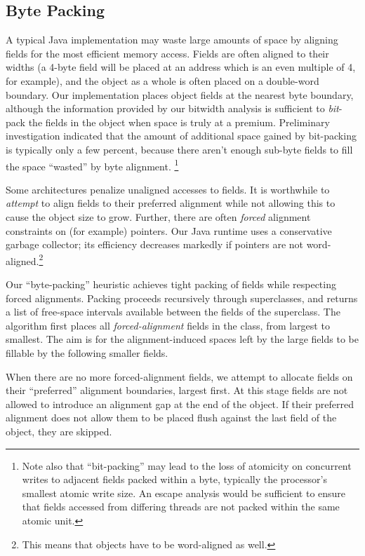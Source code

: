 \documentclass{acmconf}
\begin{document}
\subsection{Byte Packing}
%
A typical Java implementation may waste large amounts of space by
aligning fields for the most efficient memory access.  Fields are
often aligned to their widths (a 4-byte field will be placed at an address
which is an even multiple of 4, for example), and the object as a
whole is often placed on a double-word boundary. Our implementation
places object fields at the nearest byte boundary, although
the information provided by our bitwidth
analysis is sufficient to {\it bit}-pack the fields in the object
when space is truly at a premium.  Preliminary investigation
indicated that the amount of additional space gained by bit-packing 
is typically only a few percent, because there aren't enough sub-byte
fields to fill the space ``wasted'' by byte alignment.%
\footnote{Note also that ``bit-packing'' may lead to the loss of
atomicity on concurrent writes to adjacent fields packed within a byte,
typically the processor's smallest atomic write size.  An escape
analysis would be sufficient to ensure that fields accessed from
differing threads are not packed within the same atomic unit.}

Some architectures penalize unaligned accesses to fields.  It is
worthwhile to {\it attempt} to align fields to their preferred
alignment while not allowing this to cause the object size to grow.
Further, there are often {\it forced} alignment constraints on
(for example) pointers.  Our Java runtime uses a conservative garbage
collector; its efficiency decreases markedly if pointers are not
word-aligned.\footnote{This means that objects have to be word-aligned
  as well.}

Our ``byte-packing'' heuristic achieves
tight packing of fields while respecting forced alignments.  Packing
proceeds recursively through superclasses, and returns a list of
free-space intervals available between the fields of the superclass.
The algorithm first places all {\it forced-alignment} fields in
the class, from largest to smallest.  The aim is for the
alignment-induced spaces left by the large fields to be fillable by
the following smaller fields.

When there are no more forced-alignment fields, we attempt to allocate
fields on their ``preferred'' alignment boundaries, largest first.
At this stage fields are not allowed to introduce an alignment gap at
the end of the object.  If their preferred alignment does not allow
them to be placed flush
against the last field of the object, they are skipped.
\end{document}

